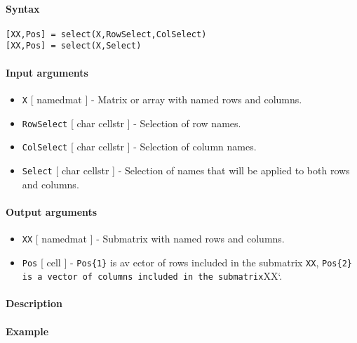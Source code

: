 


	\paragraph{Syntax}\label{syntax}

\begin{verbatim}
[XX,Pos] = select(X,RowSelect,ColSelect)
[XX,Pos] = select(X,Select)
\end{verbatim}

\paragraph{Input arguments}\label{input-arguments}

\begin{itemize}
\item
  \texttt{X} {[} namedmat {]} - Matrix or array with named rows and
  columns.
\item
  \texttt{RowSelect} {[} char \textbar{} cellstr {]} - Selection of row
  names.
\item
  \texttt{ColSelect} {[} char \textbar{} cellstr {]} - Selection of
  column names.
\item
  \texttt{Select} {[} char \textbar{} cellstr {]} - Selection of names
  that will be applied to both rows and columns.
\end{itemize}

\paragraph{Output arguments}\label{output-arguments}

\begin{itemize}
\item
  \texttt{XX} {[} namedmat {]} - Submatrix with named rows and columns.
\item
  \texttt{Pos} {[} cell {]} - \texttt{Pos\{1\}} is av ector of rows
  included in the submatrix \texttt{XX},
  \texttt{Pos\{2\} is a vector of columns included in the submatrix}XX`.
\end{itemize}

\paragraph{Description}\label{description}

\paragraph{Example}\label{example}


